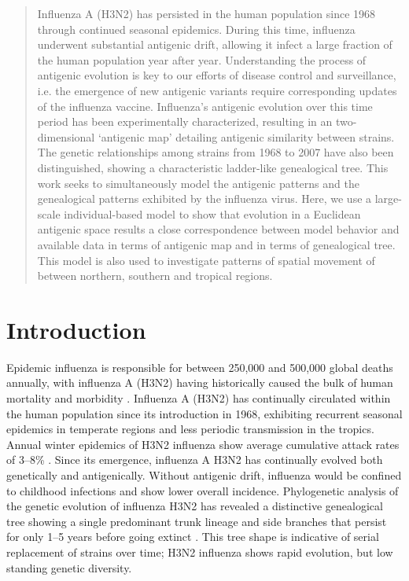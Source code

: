 \documentclass[11pt,oneside,letterpaper]{article}
\begin{document}
\begin{abstract}
Influenza A (H3N2) has persisted in the human population since 1968 through continued seasonal epidemics.  During this time, influenza underwent substantial antigenic drift, allowing it infect a large fraction of the human population year after year.  Understanding the process of antigenic evolution is key to our efforts of disease control and surveillance, i.e. the emergence of new antigenic variants require corresponding updates of the influenza vaccine.  Influenza's antigenic evolution over this time period has been experimentally characterized, resulting in an two-dimensional `antigenic map' detailing antigenic similarity between strains.  The genetic relationships among strains from 1968 to 2007 have also been distinguished, showing a characteristic ladder-like genealogical tree.  This work seeks to simultaneously model the antigenic patterns and the genealogical patterns exhibited by the influenza virus.  Here, we use a large-scale individual-based model to show that evolution in a Euclidean antigenic space results a close correspondence between model behavior and available data in terms of antigenic map and in terms of genealogical tree.  This model is also used to investigate patterns of spatial movement of between northern, southern and tropical regions.
\end{abstract}

\section*{Introduction}

Epidemic influenza is responsible for between 250,000 and 500,000 global deaths annually, with influenza A (H3N2) having historically caused the bulk of human mortality and morbidity \cite{flufactsheet}.  Influenza A (H3N2) has continually circulated within the human population since its introduction in 1968, exhibiting recurrent seasonal epidemics in temperate regions and less periodic transmission in the tropics.  Annual winter epidemics of H3N2 influenza show average cumulative attack rates of 3--8\% \cite{Monto93,Koelle09}.  Since its emergence, influenza A H3N2 has continually evolved both genetically and antigenically.  Without antigenic drift, influenza would be confined to childhood infections and show lower overall incidence.  Phylogenetic analysis of the genetic evolution of influenza H3N2 has revealed a distinctive genealogical tree showing a single predominant trunk lineage and side branches that persist for only 1--5 years before going extinct \cite{Fitch97}.  This tree shape is indicative of serial replacement of strains over time; H3N2 influenza shows rapid evolution, but low standing genetic diversity.
\end{document}
